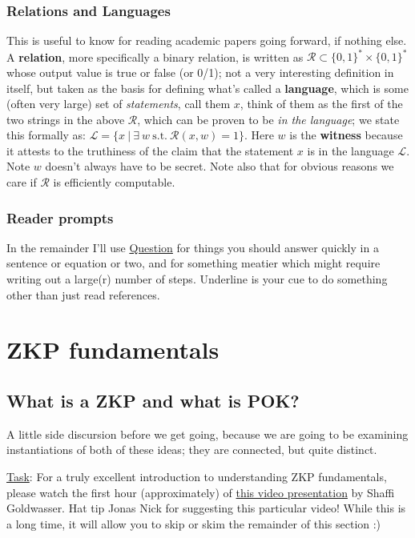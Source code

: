 \documentclass[10pt,a4paper]{article}
\begin{document}
\subsubsection{Relations and Languages}

This is useful to know for reading academic papers going forward, if nothing else. A \textbf{relation}, more specifically a binary relation, is written as $\mathcal{R} \subset \{0,1\}^{*} \times \{0,1\}^{*}$ whose output value is true or false (or 0/1); not a very interesting definition in itself, but taken as the basis for defining what's called a \textbf{language}, which is some (often very large) set of \emph{statements}, call them $x$, think of them as the first of the two strings in the above $\mathcal{R}$, which can be proven to be \emph{in the language}; we state this formally as: $\mathcal{L} = \{x \ | \ \exists \ w \ \textrm{s.t.} \ \mathcal{R}(x, w)=1\}$. Here $w$ is the \textbf{witness} because it attests to the truthiness of the claim that the statement $x$ is in the language $\mathcal{L}$. Note $w$ doesn't always have to be secret. Note also that for obvious reasons we care if $\mathcal{R}$ is efficiently computable.


\subsubsection{Reader prompts}
In the remainder I'll use \underline{Question} for things you should answer quickly in a sentence or equation or two, and  for something meatier which might require writing out a large(r) number of steps. Underline is your cue to do something other than just read references.


\section{ZKP fundamentals}

\subsection{What is a ZKP and what is POK?}

A little side discursion before we get going, because we are going to be examining instantiations of both of these ideas; they are connected, but quite distinct.

\begin{framed}
\underline{Task}: For a truly excellent introduction to understanding ZKP fundamentals, please watch the first hour (approximately) of \href{https://www.youtube.com/watch?v=uchjTIlPzFo}{this video presentation} by Shaffi Goldwasser. Hat tip Jonas Nick for suggesting this particular video! While this is a long time, it will allow you to skip or skim the remainder of this section :)
\end{framed}
\end{document}
